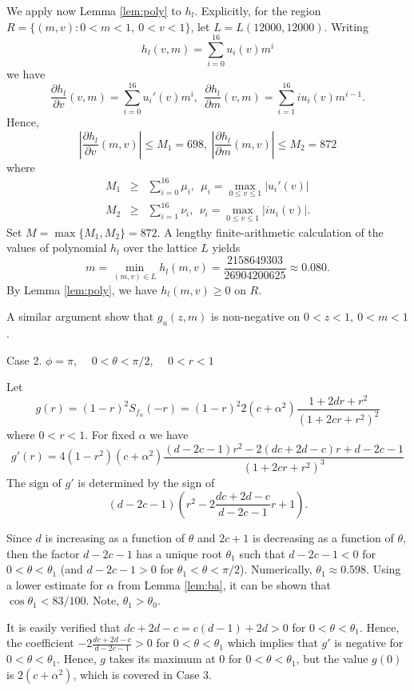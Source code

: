 \documentclass[12pt]{icgft}
\newcommand{\ds}{\displaystyle}
\theoremstyle{definition}
\numberwithin{equation}{section}
\begin{document}
We apply now Lemma \ref{lem:poly} to $h_l$.  Explicitly, for the region $R = \{(m,v) : 0 < m < 1, \
0 < v < 1 \}$, let $L = L(12000,12000)$. Writing
$$h_l(v,m) = \sum_{i=0}^{16} u_i(v)m^i$$
\noindent we have
$$\frac{\partial h_l}{\partial v}(v,m) = \sum_{i=0}^{16} {u_i}'(v) m^i , \ \
\frac{\partial h_l}{\partial m}(v,m) = \sum_{i=1}^{16} i u_i(v) m^{i-1} .$$
\noindent Hence,
$$\left | \frac{\partial h_l}{\partial v}(m,v) \right | \le M_1 = 698, \ \left | \frac{\partial h_l}{\partial m}(m,v) \right | \le M_2 = 872$$
\noindent where
\begin{eqnarray*}
M_1 &\ge& \sum_{i=0}^{16} \mu_i,\ \  \mu_i = \max_{0\le v \le 1} |{u_i}'(v)| \\
M_2 &\ge& \sum_{i=1}^{16} \nu_i,\ \  \nu_i = \max_{0\le v \le 1} |i u_i(v)|.
\end{eqnarray*}
\noindent Set $M = \max\{M_1,M_2\} = 872$.  A lengthy finite-arithmetic calculation of the values of polynomial $h_l$ over the lattice $L$ yields
$${\ds m = \min_{(m,v) \in L} h_l(m,v) = \frac{2158649303}{26904200625} \approx 0.080}.$$
\noindent By Lemma \ref{lem:poly},  we have $h_l(m,v) \ge 0$ on $R$.

A similar argument show that $g_u(z,m)$ is non-negative on $0 < z < 1, \  0 < m < 1 $.

\vspace{0.1in}

Case 2. $\phi = \pi$, \ \ $0 < \theta < \pi/2$, \ \ $0 < r < 1$

\vspace{0.1in}

Let
$$g(r) = (1-r)^2 S_{f_{\alpha}}(-r) = (1-r)^2 2(c+\alpha^2) \frac{1+2dr+r^2}{(1+2cr+r^2)^2}$$
\noindent where $0 < r < 1$.  For fixed $\alpha$ we have
$$g'(r) = 4(1-r^2)(c+\alpha^2)\frac{(d-2c-1)r^2 -2(dc+2d-c)r + d-2c-1}{(1+2cr+r^2)^3}$$
\noindent The sign of $g'$ is determined by the sign of
$$(d-2c-1)(r^2 -2\frac{dc+2d-c}{d-2c-1}r + 1).$$

Since $d$ is increasing as a function of $\theta$ and $2c+1$ is decreasing as a function of $\theta$, then the factor $d-2c-1$ has a unique root $\theta_1$ such that $d-2c-1 < 0$ for $0 < \theta < \theta_1$ (and $d-2c-1 > 0$ for $\theta_1 < \theta < \pi/2$).  Numerically, $\theta_1 \approx 0.598$.  Using a lower estimate for $\alpha$ from Lemma \ref{lem:ba}, it can be shown that $\cos \theta_1 < 83/100$. Note, $\theta_1 > \theta_0$.

It is easily verified that $dc+2d-c = c(d-1) + 2d >0$ for $0 < \theta < \theta_1$.  Hence, the coefficient $-2\frac{dc+2d-c}{d-2c-1} > 0$ for $0 < \theta < \theta_1$ which implies that $g'$ is negative for $0 < \theta < \theta_1$. Hence, $g$ takes its maximum at $0$ for   $0 < \theta < \theta_1$, but the value $g(0)$ is $2(c+\alpha^2)$, which is covered in Case 3.
\end{document}
